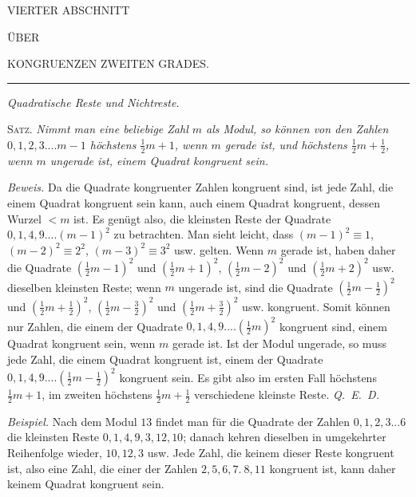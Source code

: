 \begin{center}
{\Large VIERTER ABSCHNITT}\par\bigskip
{\small ÜBER}\par\bigskip
{\Large KONGRUENZEN ZWEITEN GRADES.}
\end{center}

\begin{center}\rule{.09\linewidth}{.25pt}\end{center}

\begin{center}\small\emph{Quadratische Reste und Nichtreste.}\end{center}


\textsc{Satz.} \emph{Nimmt man eine beliebige Zahl $m$ als Modul, so können von den Zahlen $0,1,2,3....m-1$ höchstens $\tfrac12m+1$, wenn $m$ gerade ist, und höchstens $\tfrac12m+\tfrac12$, wenn $m$ ungerade ist, einem Quadrat kongruent sein.}

\emph{Beweis.} Da die Quadrate kongruenter Zahlen kongruent sind, ist jede Zahl, die einem Quadrat kongruent sein kann, auch einem Quadrat kongruent, dessen Wurzel $<m$ ist. Es genügt also, die kleinsten Reste der Quadrate $0,1,4,9....(m-1)^2$ zu betrachten. Man sieht leicht, dass $(m-1)^2\equiv1$, $(m-2)^2\equiv2^2$, $(m-3)^2\equiv3^2$ usw. gelten. Wenn $m$ gerade ist, haben daher die Quadrate $(\tfrac12m-1)^2$ und $(\tfrac12m+1)^2$, $(\tfrac12m-2)^2$ und $(\tfrac12m+2)^2$ usw. dieselben kleinsten Reste; wenn $m$ ungerade ist, sind die Quadrate $(\tfrac12m-\tfrac12)^2$ und $(\tfrac12m+\tfrac12)^2$, $(\tfrac12m-\tfrac32)^2$ und $(\tfrac12m+\tfrac32)^2$ usw. kongruent. Somit können nur Zahlen, die einem der Quadrate $0,1,4,9....(\tfrac12m)^2$ kongruent sind, einem Quadrat kongruent sein, wenn $m$ gerade ist. Ist der Modul ungerade, so muss jede Zahl, die einem Quadrat kongruent ist, einem der Quadrate $0,1,4,9....(\tfrac12m-\tfrac12)^2$ kongruent sein. Es gibt also im ersten Fall höchstens $\tfrac12m+1$, im zweiten höchstens $\tfrac12m+\tfrac12$ verschiedene kleinste Reste. \mbox{\emph{Q. E. D.}}

\emph{Beispiel.} Nach dem Modul $13$ findet man für die Quadrate der Zahlen $0,1,2,3...6$ die kleinsten Reste $0,1,4,9,3,12,10$; danach kehren dieselben in umgekehrter Reihenfolge wieder, $10,12,3$ usw. Jede Zahl, die keinem dieser Reste kongruent ist, also eine Zahl, die einer der Zahlen $2,5,6,7.\ 8,11$ kongruent ist, kann daher keinem Quadrat kongruent sein.

